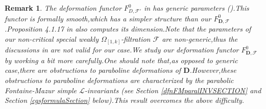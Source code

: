 \documentclass[SecEq,CM,GP]{degruyter-crelle} %
\theoremstyle{plain}
\newtheorem{rmk}[thm]{Remark}
\newcommand{\ccyc}{{\chi_{\mathrm{cyc}}}}
\newcommand{\Dpik}{{\mathbf{D}}}
\newcommand{\gr}{{\rm gr}}
\newcommand{\hH}{{\mathrm{H}}}
\newcommand{\omepik}{\Omega_{[1,k]}}
\newcommand{\tee}{{{\otimes}_{\cR_{E,L}}}}
\newcommand{\cR}{\mathcal R}
\newcommand{\cF}{\mathcal F}
\newcommand{\sL}{\mathcal L}
\begin{document}
\begin{rmk}\label{nongenediffobstru}
The deformation functor $F_{D,\cF'}^0$ in \cite[Section 4.1.2]{Ding2021} has generic parameters (\cite[(4.13)]{Ding2021}).\;This functor is formally smooth,\;which has a simpler structure than our  $F_{\Dpik,\cF}^0$.\;Proposition 4.1.17 in \cite{Ding2021} also computes its dimension.\;Note that the parameters of our non-critical special weakly $\omepik$-filtration $\cF$ are \textit{non-generic},\;thus the discussions in \cite[Section 4.1.2]{Ding2021} are not valid for our case.\;We study our deformation functor  $F_{\Dpik,\cF}^0$ by working a bit more carefully.\;One should note that,\;as opposed to generic case,\;there are obstructions to paraboline deformations of $\Dpik$.\;However,\;these obstructions to paraboline deformations are characterized by the parabolic Fontaine-Mazur  simple $\sL$-invariants (see Section \ref{dfnFMparalINVSECTION} and Section \ref{cgsformulaSection} below).\;This result overcomes the above difficulty.\;
\end{rmk}










\end{document}
